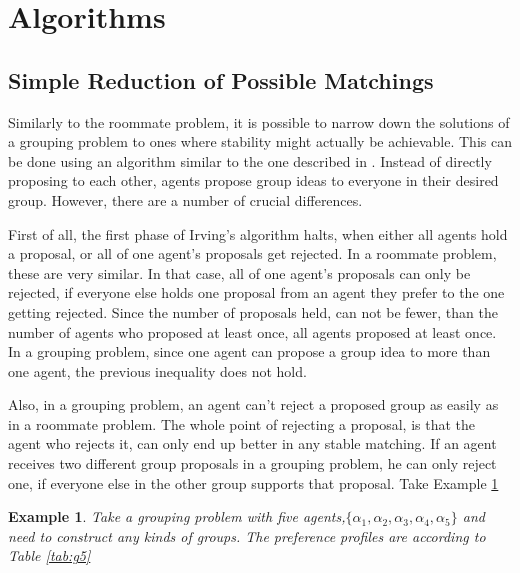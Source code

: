 \documentclass{elsarticle}
\newtheorem{myex}{Example}
\begin{document}
\section{Algorithms}
\label{sec:algorithms}

\subsection{Simple Reduction of Possible Matchings}

Similarly to the roommate problem, it is possible to narrow down the solutions of a grouping problem to ones where stability might actually be achievable. This can be done using an algorithm similar to the one described in \citep{irving85}. Instead of directly proposing to each other, agents propose group ideas to everyone in their desired group. However, there are a number of crucial differences.

First of all, the first phase of Irving's algorithm halts, when either all agents hold a proposal, or all of one agent's proposals get rejected. In a roommate problem, these are very similar. In that case, all of one agent's proposals can only be rejected, if everyone else holds one proposal from an agent they prefer to the one getting rejected. Since the number of proposals held, can not be fewer, than the number of agents who proposed at least once, all agents proposed at least once. In a grouping problem, since one agent can propose a group idea to more than one agent, the previous inequality does not hold.

Also, in a grouping problem, an agent can't reject a proposed group as easily as in a roommate problem. The whole point of rejecting a proposal, is that the agent who rejects it, can only end up better in any stable matching. If an agent receives two different group proposals in a grouping problem, he can only reject one, if everyone else in the other group supports that proposal. Take Example \ref{ex:g5}

\begin{myex}

\label{ex:g5}
Take a grouping problem with five agents,$ \{ \alpha_1, \alpha_2, \alpha_3, \alpha_4, \alpha_5\} $ and need to construct any kinds of groups. The preference profiles are according to Table \ref{tab:g5} 
\end{myex}
\end{document}
